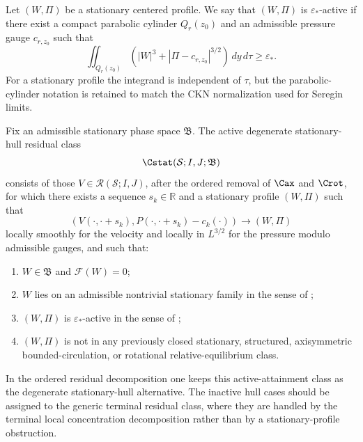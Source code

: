 \begin{definition}
\label{def:R3-active-profile}
Let \((W,\Pi)\) be a stationary centered profile.  We say that \((W,\Pi)\) is
\(\varepsilon_*\)-active if there exist a compact parabolic cylinder
\(Q_r(z_0)\) and an admissible pressure gauge \(c_{r,z_0}\) such that
\begin{equation}\label{eq:R3-active-ckn}
   \iint_{Q_r(z_0)}
   \left(|W|^3+|\Pi-c_{r,z_0}|^{3/2}\right)\,dy\,d\tau
   \ge \varepsilon_* .
\end{equation}
For a stationary profile the integrand is independent of \(\tau\), but the
parabolic-cylinder notation is retained to match the CKN normalization used for
Seregin limits.
\end{definition}

\begin{definition}
\label{def:R3-active-class}
Fix an admissible stationary phase space \(\mathfrak B\).  The active
degenerate stationary-hull residual class
\[
   \Cstat(\mathcal S;I,J;\mathfrak B)
\]
consists of those \(V\in\mathcal R(\mathcal S;I,J)\), after the ordered
removal of \(\Cax\) and \(\Crot\), for which there exists a
sequence \(s_k\in\mathbb R\) and a stationary profile \((W,\Pi)\) such that
\begin{equation}\label{eq:R3-hull-convergence}
   (V(\cdot,\cdot+s_k),P(\cdot,\cdot+s_k)-c_k(\cdot))
   \longrightarrow (W,\Pi)
\end{equation}
locally smoothly for the velocity and locally in \(L^{3/2}\) for the pressure
modulo admissible gauges, and such that:
\begin{enumerate}[label=(\roman*)]
   \item \(W\in\mathfrak B\) and \(\mathcal F(W)=0\);
   \item \(W\) lies on an admissible nontrivial stationary family in the sense
      of ;
   \item \((W,\Pi)\) is \(\varepsilon_*\)-active in the sense of
      ;
   \item \((W,\Pi)\) is not in any previously closed stationary, structured,
      axisymmetric bounded-circulation, or rotational relative-equilibrium
      class.
\end{enumerate}
In the ordered residual decomposition one keeps this active-attainment class as
the degenerate stationary-hull alternative.  The inactive hull cases
should be assigned to the generic terminal residual class, where they are
handled by the terminal local concentration decomposition rather than by a
stationary-profile obstruction.
\end{definition}

